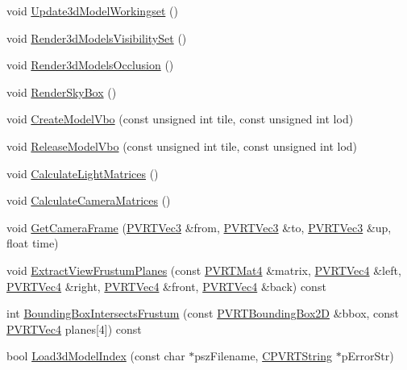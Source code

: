 \begin{DoxyCompactItemize}
\item 
void \hyperlink{class_o_g_l_e_s_navigation3_d_a3a81e8c4705f0a667467f0e7f92a9fe7}{Update3d\+Model\+Workingset} ()
\item 
void \hyperlink{class_o_g_l_e_s_navigation3_d_add4695b03f8ec7dda72bc9b8c99f0c60}{Render3d\+Models\+Visibility\+Set} ()
\item 
void \hyperlink{class_o_g_l_e_s_navigation3_d_a584fbfcc908fc94f83b9c99742446f08}{Render3d\+Models\+Occlusion} ()
\item 
void \hyperlink{class_o_g_l_e_s_navigation3_d_a7e3e7a207eac74a9615271110fcb2a43}{Render\+Sky\+Box} ()
\item 
void \hyperlink{class_o_g_l_e_s_navigation3_d_a532fd2299c7fe4fe95f9b3690389454a}{Create\+Model\+Vbo} (const unsigned int tile, const unsigned int lod)
\item 
void \hyperlink{class_o_g_l_e_s_navigation3_d_ac540c9552d3321ffaf1b07d4bf0db1e6}{Release\+Model\+Vbo} (const unsigned int tile, const unsigned int lod)
\item 
void \hyperlink{class_o_g_l_e_s_navigation3_d_a6787ae94d6e0e7d8e1fdf049d19329ad}{Calculate\+Light\+Matrices} ()
\item 
void \hyperlink{class_o_g_l_e_s_navigation3_d_a2ca2fcdfe9bf3b5e6478610c2ff88773}{Calculate\+Camera\+Matrices} ()
\item 
void \hyperlink{class_o_g_l_e_s_navigation3_d_aa381b95cd32b33a774e0829c1e66fdc4}{Get\+Camera\+Frame} (\hyperlink{struct_p_v_r_t_vec3}{P\+V\+R\+T\+Vec3} \&from, \hyperlink{struct_p_v_r_t_vec3}{P\+V\+R\+T\+Vec3} \&to, \hyperlink{struct_p_v_r_t_vec3}{P\+V\+R\+T\+Vec3} \&up, float time)
\item 
void \hyperlink{class_o_g_l_e_s_navigation3_d_a923584d9685806b498aab0e6f99863af}{Extract\+View\+Frustum\+Planes} (const \hyperlink{struct_p_v_r_t_mat4}{P\+V\+R\+T\+Mat4} \&matrix, \hyperlink{struct_p_v_r_t_vec4}{P\+V\+R\+T\+Vec4} \&left, \hyperlink{struct_p_v_r_t_vec4}{P\+V\+R\+T\+Vec4} \&right, \hyperlink{struct_p_v_r_t_vec4}{P\+V\+R\+T\+Vec4} \&front, \hyperlink{struct_p_v_r_t_vec4}{P\+V\+R\+T\+Vec4} \&back) const 
\item 
int \hyperlink{class_o_g_l_e_s_navigation3_d_ac547c871368110414b5c9234d6ec2937}{Bounding\+Box\+Intersects\+Frustum} (const \hyperlink{struct_p_v_r_t_bounding_box2_d}{P\+V\+R\+T\+Bounding\+Box2\+D} \&bbox, const \hyperlink{struct_p_v_r_t_vec4}{P\+V\+R\+T\+Vec4} planes\mbox{[}4\mbox{]}) const 
\item 
bool \hyperlink{class_o_g_l_e_s_navigation3_d_ad219541b28e51b8ef2071760bc97ec9e}{Load3d\+Model\+Index} (const char $\ast$psz\+Filename, \hyperlink{class_c_p_v_r_t_string}{C\+P\+V\+R\+T\+String} $\ast$p\+Error\+Str)

\end{DoxyCompactItemize}
